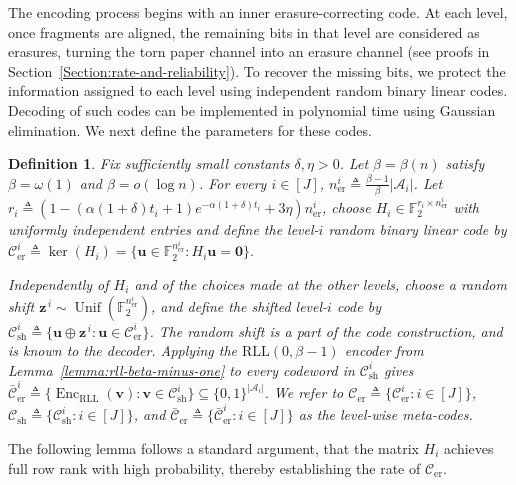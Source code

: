 \documentclass[journal,letterpaper,onecolumn,11pt]{IEEEtran}
\newcommand{\cA}{\mathcal{A}}
\newcommand{\cC}{\mathcal{C}}
\newcommand{\boldu}{\mathbf{u}}
\newcommand{\boldv}{\mathbf{v}}
\newcommand{\boldz}{\mathbf{z}}
\newtheorem{definition}{Definition}
\begin{document}
The encoding process begins with an inner erasure-correcting code.
At each level, once fragments are aligned, the remaining bits  in that level are considered as erasures, turning the torn paper channel into an erasure channel (see proofs in Section~\ref{Section:rate-and-reliability}).
To recover the missing bits, we protect the information assigned to each level using independent random binary linear codes. 
Decoding of such codes can be implemented in polynomial time using Gaussian elimination. 
We next define the parameters for these codes.

\begin{definition}\label{definition:random-linear-erasure-codes}
Fix sufficiently small constants $\delta,\eta>0$. 
Let $\beta=\beta(n)$ satisfy $\beta=\omega(1)$ and $\beta=o(\log n)$. 
For every $i\in[J]$, 
$
n_{\mathrm{er}}^i\triangleq\frac{\beta-1}{\beta}|\cA_i|$.
Let $r_i\triangleq\left(1-(\alpha(1+\delta)t_i+1)e^{-\alpha(1+\delta)t_i}+3\eta\right)n^i_{\mathrm{er}}$, choose $H_i\in\mathbb F_2^{r_i\times n_{\mathrm{er}}^i}$ with uniformly independent entries and define the level-$i$ random binary linear code by
$\cC_{\mathrm{er}}^i\triangleq\ker(H_i)=\{\boldu\in\mathbb F_2^{n_{\mathrm{er}}^i}:H_i\boldu=\mathbf 0\}.$

Independently of $H_i$ and of the choices made at the other levels, choose a random shift $\boldz^{\,i}\sim\operatorname{Unif}\!(\mathbb F_2^{n_{\mathrm{er}}^i})$, and
define the shifted level-$i$ code by
$\cC_{\mathrm{sh}}^i\triangleq\{\boldu\oplus\boldz^{\,i}:
\boldu\in\cC_{\mathrm{er}}^i\}$.
The random shift is a part of the code construction, and is known to the decoder. 
Applying the $\mathrm{RLL}(0,\beta-1)$ encoder from Lemma~\ref{lemma:rll-beta-minus-one} to every codeword in $\cC_{\mathrm{sh}}^i$ gives
$\bar{\cC}_{\mathrm{er}}^i\triangleq\{\operatorname{Enc}_{\mathrm{RLL}}(\boldv):\boldv\in\cC_{\mathrm{sh}}^i\}\subseteq\{0,1\}^{|\cA_i|}.$
We refer to $\cC_{\mathrm{er}}\triangleq\{\cC_{\mathrm{er}}^i:i\in[J]\}$, $\cC_{\mathrm{sh}}\triangleq\{\cC_{\mathrm{sh}}^i:i\in[J]\}$, and $\bar{\cC}_{\mathrm{er}}\triangleq\{\bar{\cC}_{\mathrm{er}}^i:i\in[J]\}$ as the level-wise meta-codes.
\end{definition}
The following lemma follows a standard argument, that the matrix $H_i$ achieves full row rank with high probability, thereby establishing the rate of $\cC_{\mathrm{er}}$.
\end{document}
